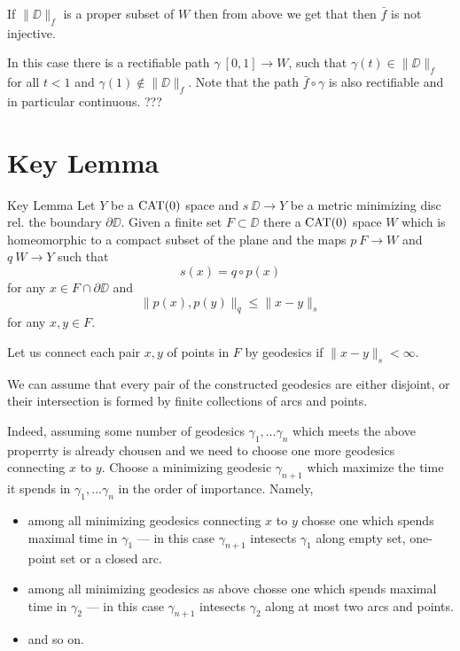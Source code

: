 \documentclass[a4paper,10pt]{amsart}
\begin{document}
If $\|\DD\|_f$ is a proper subset of $W$ 
then from above we get that
then $\bar f$ is not injective.

In this case there is a rectifiable path $\gamma\:[0,1]\to W$,
such that $\gamma(t)\in\|\DD\|_f$ for all $t<1$ and $\gamma(1)\notin \|\DD\|_f$.
Note that the path $\bar f\circ \gamma$ is also rectifiable and in particular continuous.
???
\qeds








\section{Key Lemma}


\begin{thm}{Key Lemma}\label{lem:key}
Let $Y$ be a $\mathop{\rm CAT}\nolimits(0)$ space and $s\:\DD\to Y$ 
be a metric minimizing disc rel. the boundary $\partial \DD$.
Given a finite set $F\subset \DD$
there a $\mathop{\rm CAT}\nolimits(0)$ space $W$ which is homeomorphic to a compact subset of the plane
and the maps $p\:F\to W$ and $q\:W\to Y$ such that
\[s(x)=q\circ p(x)\] 
for any $x\in F\cap \partial \DD$
and 
\[\|p(x),p(y)\|_q\le \|x-y\|_s\] 
for any $x,y\in F$.
\end{thm}

Let us connect each pair $x,y$ of points in $F$ by geodesics
if $\|x-y\|_s<\infty$.

We can assume that 
every pair of the constructed geodesics 
are either disjoint, or their intersection is formed by finite collections of arcs and points.

Indeed, assuming some number of geodesics $\gamma_1,\dots\gamma_n$ which meets the above properrty is already chousen and we need to choose one more geodesics connecting $x$ to $y$.
Choose a minimizing geodesic $\gamma_{n+1}$ which maximize the time it spends in $\gamma_1,\dots\gamma_n$  in the order of importance.
Namely, 
\begin{itemize}
\item  among all minimizing geodesics connecting $x$ to $y$
chosse one which spends maximal time in $\gamma_1$ --- in this case $\gamma_{n+1}$ intesects $\gamma_1$ along empty set, one-point set or a closed arc.
\item among all minimizing geodesics as above
chosse one which spends maximal time in $\gamma_2$ --- in this case $\gamma_{n+1}$ intesects $\gamma_2$ along at most two arcs and points.
\item and so on.
\end{itemize}
\end{document}

